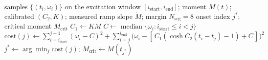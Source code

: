 \documentclass[10pt]{article}
\begin{document}
\begin{algorithm}[h]
\caption{COSH onset detection (single run)}
\label{alg:cosh}
\begin{algorithmic}[1]
\Require samples $\{(t_i,\omega_i)\}$ on the excitation window
  $[i_{\mathrm{start}}, i_{\mathrm{end}}]$; moment $M(t)$;
  calibrated $(C_2, K)$; measured ramp slope $\dot M$;
  margin $N_{\mathrm{seg}} = 8$
\Ensure onset index $j^\ast$; critical moment $M_{\mathrm{crit}}$
\State $C_1 \gets K\dot M$
  \State $C \gets \operatorname{median}\{\omega_i :
    i_{\mathrm{start}} \le i < j\}$
  \State $\mathrm{cost}(j) \gets
    \sum_{i=i_{\mathrm{start}}}^{j-1}(\omega_i - C)^2
    + \sum_{i=j}^{i_{\mathrm{end}}}\bigl(\omega_i
    - [\,C_1(\cosh C_2 (t_i - t_j) - 1) + C\,]\bigr)^2$
\EndFor
\State $j^\ast \gets \arg\min_j \mathrm{cost}(j)$;\quad
  $M_{\mathrm{crit}} \gets M(t_{j^\ast})$
\end{algorithmic}
\end{algorithm}
\end{document}
